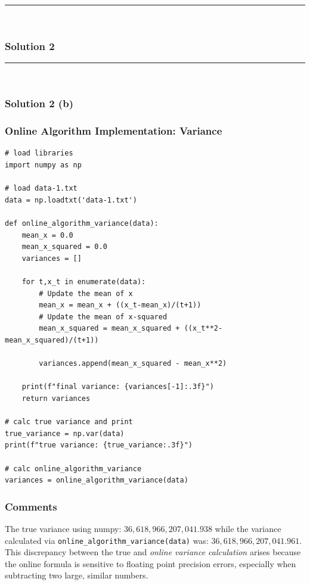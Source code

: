 \documentclass{article}
\begin{document}
\noindent\rule{\textwidth}{0.4pt}\\

\newpage
\subsubsection*{Solution 2}
\noindent\rule{\textwidth}{0.4pt}\\
\subsubsection*{Solution 2 (b)}
\subsubsection*{Online Algorithm Implementation: Variance}

\begin{lstlisting}
# load libraries
import numpy as np

# load data-1.txt
data = np.loadtxt('data-1.txt')

def online_algorithm_variance(data):
    mean_x = 0.0
    mean_x_squared = 0.0
    variances = []

    for t,x_t in enumerate(data):
        # Update the mean of x
        mean_x = mean_x + ((x_t-mean_x)/(t+1))
        # Update the mean of x-squared
        mean_x_squared = mean_x_squared + ((x_t**2-mean_x_squared)/(t+1))
        
        variances.append(mean_x_squared - mean_x**2)

    print(f"final variance: {variances[-1]:.3f}")
    return variances

# calc true variance and print
true_variance = np.var(data)
print(f"true variance: {true_variance:.3f}")

# calc online_algorithm_variance
variances = online_algorithm_variance(data)
\end{lstlisting}


\subsubsection*{Comments}
\parbox{\textwidth}{
The true variance using numpy: $36,618,966,207,041.938$ while the variance calculated via \texttt{online\_algorithm\_variance(data)} was: $36,618,966,207,041.961$. This discrepancy between the true and \textit{online variance calculation} arises because the online formula is sensitive to floating point precision errors, especially when subtracting two large, similar numbers. 
}
\end{document}
